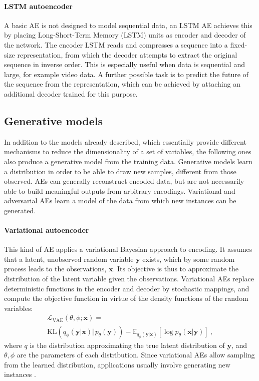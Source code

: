 \documentclass[preprint,5p,compress]{elsarticle}
\begin{document}
\paragraph{LSTM autoencoder \cite{LSTMAE}} A basic AE is not designed to model sequential data, an LSTM AE achieves this by placing Long-Short-Term Memory (LSTM) \cite{LSTM} units as encoder and decoder of the network. The encoder LSTM reads and compresses a sequence into a fixed-size representation, from which the decoder attempts to extract the original sequence in inverse order. This is especially useful when data is sequential and large, for example video data. A further possible task is to predict the future of the sequence from the representation, which can be achieved by attaching an additional decoder trained for this purpose.


\subsection{Generative models}\label{Sec.Generative}

In addition to the models already described, which essentially provide different mechanisms to reduce the dimensionality of a set of variables, the following ones also produce a generative model from the training data. Generative models learn a distribution in order to be able to draw new samples, different from those observed. AEs can generally reconstruct encoded data, but are not necessarily able to build meaningful outputs from arbitrary encodings. Variational and adversarial AEs learn a model of the data from which new instances can be generated.

\paragraph{Variational autoencoder \cite{VariationalAE}} This kind of AE applies a variational Bayesian \cite{VariationalBayes} approach to encoding. It assumes that a latent, unobserved random variable $\mathbf{y}$ exists, which by some random process leads to the observations, $\mathbf{x}$. Its objective is thus to approximate the distribution of the latent variable given the observations. Variational AEs replace deterministic functions in the encoder and decoder by stochastic mappings, and compute the objective function in virtue of the density functions of the random variables:
\begin{multline}
  \mathcal L_{\mathrm{VAE}}(\theta, \phi; \mathbf{x})=\\\mathrm{KL}(
  q_{\phi}(\mathbf{y}\vert\mathbf{x})
  \Vert
  p_{\theta}(\mathbf{y})
  )
  -
  \mathbb E_{  q_{\phi}(\mathbf{y}\vert\mathbf{x})}\left[\log p_{\theta}(\mathbf{x}\vert\mathbf{y})\right]~,
\end{multline}
where $q$ is the distribution approximating the true latent distribution of $\mathbf{y}$, and $\theta,\phi$ are the parameters of each distribution. Since variational AEs allow sampling from the learned distribution, applications usually involve generating new instances \cite{VAEgenerating,rezende2014stochastic}.
\end{document}
